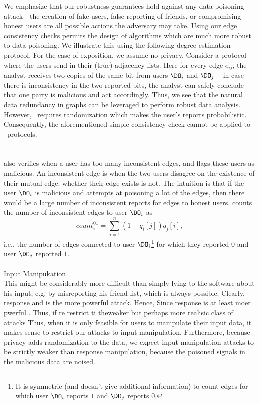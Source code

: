 We emphasize that our robustness guarantees hold against any data poisoning attack---the creation of fake users, false reporting of friends, or compromising honest users are all possible actions the adversary may take.
Using our edge consistency checks permits the design of algorithms which are much more robust to data poisoning.
 We illustrate this using the following degree-estimation protocol. For the ease of exposition, we assume no privacy. Consider a protocol where the users send in their (true) adjacency lists. Here for every edge $e_{ij}$, the analyst receives two copies of the same bit from users $\DO_i$ and $\DO_j$ -- in case there is inconsistency in the two reported bits, the analyst can safely conclude that one party is malicious and act accordingly. Thus, we see that the natural data redundancy in graphs can be leveraged to perform robust data analysis. However, \ldp~requires randomization which makes the user's reports probabilistic. Consequently, the aforementioned simple consistency check cannot be applied to \ldp~protocols.
\\\\
\DegRRCheck{}\\\DegRRCheck{} also verifies when a user has too many inconsistent edges, and flags these users as malicious. An inconsistent edge is when the two users disagree on the existence of their mutual edge. whether their edge exists is not. The intuition is that if the user $\DO_i$ is malicious and attempts at poisoning a lot of the edges, then there would be a large number of inconsistent reports for edges to honest users. \DegRRCheck{}  counts the number of inconsistent edges to user $\DO_i$ as 
\[
  count_i^{01} = \sum_{j=1}^n (1-q_{i}[j]) q_{j}[i],
\]
i.e., the number of edges connected to user $\DO_i$\footnote{It is symmetric (and doesn't give additional information) to count edges for which user $\DO_i$ reports $1$ and $\DO_j$ reports $0$.} for
which they reported $0$ and user $\DO_j$ reported $1$.  
\\\\Input Manipukation\\
This might be considerably more difficult than simply lying to the software about his input, e.g. by misreporting his friend list, which is always possible. Clearly, response and is the more powerful attack. Hence, Since response is at least moer pwerful . Thus, if re restrict ti theweaker but perhaps more realisic class of attacks Thus, when it is only feasible for users to manipulate their input data, it makes sense to restrict our attacks to input manipulation. Furthermore, because privacy adds randomization to the data, we expect input manipulation attacks to be strictly weaker than response manipulation, because the poisoned signals in the malicious data are noised. 